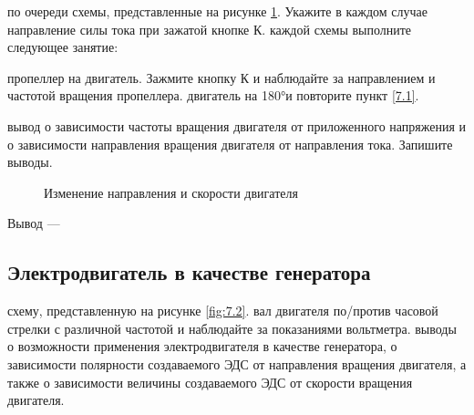 \begin{enumerate}
     по очереди схемы, представленные на рисунке \ref{fig:7.1}. Укажите в каждом случае направление силы тока при зажатой кнопке К.
     каждой схемы выполните следующее занятие:
    \begin{enumerate}
         пропеллер на двигатель. Зажмите кнопку К и наблюдайте за направлением и частотой вращения пропеллера.\label{7.1}
         двигатель на 180°и повторите пункт \ref{7.1}.
    \end{enumerate}
     вывод о зависимости частоты вращения двигателя от приложенного напряжения и о зависимости направления вращения двигателя от направления тока. Запишите выводы. 

\begin{figure}[h]
\begin{minipage}[h]{0.5\linewidth}
\end{minipage}
\hfill
\begin{minipage}[h]{0.5\linewidth}
\end{minipage}
\caption{Изменение направления и скорости двигателя}
\label{fig:7.1}
\end{figure}



Вывод --- \hrulefill

\hrulefill

\hrulefill

\end{enumerate}

\subsection{Электродвигатель в качестве генератора}

\begin{enumerate}
     схему, представленную на рисунке \ref{fig:7.2}.
     вал двигателя по/против часовой стрелки с различной частотой и наблюдайте за показаниями вольтметра.
     выводы о возможности применения электродвигателя в качестве генератора, о зависимости полярности создаваемого ЭДС от направления вращения двигателя, а также о зависимости величины создаваемого ЭДС от скорости вращения двигателя.
\end{enumerate}

